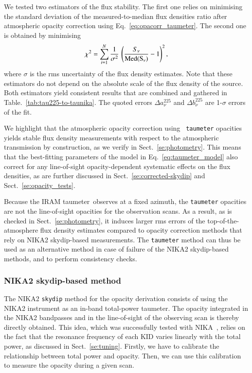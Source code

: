 \documentclass[traditionalabstract]{aa}
\newcommand{\taumeter}{taumeter}
\newcommand{\lp}[1]{#1}
\newcommand{\rev}[1]{#1}
\begin{document}
{We tested two estimators of the flux stability. The first one relies
on minimising the standard deviation of the measured-to-median flux
densities ratio after atmospheric opacity correction using
Eq.~\ref{eq:opacorr_taumeter}. The second one is obtained by minimising
\begin{equation}
\chi^2 = \sum_{i=1}^{N} \frac{1}{\sigma^2} \, \left( \frac{S_\nu}{\rm{Med}(S_\nu)} -1 \right)^2,  
\end{equation}
where $\sigma$ is the rms uncertainty of the flux density estimates. Note
that these estimators do not depend on
the absolute scale of the flux density of the source. Both estimators
yield consistent results that are combined and gathered in
Table.~\ref{tab:tau225-to-taunika}. The quoted errors
$\Delta a_\nu^{225}$ and $\Delta b_\nu^{225}$ are 1-$\sigma$ errors of
the fit.

{\rev We highlight that the atmospheric opacity correction using {\tt
taumeter} opacities yields stable flux density measurements with
respect to the atmospheric transmission by construction, as we
verify in Sect.~\ref{se:photometry}. This means that the best-fitting
parameters of the model in Eq.~\ref{eq:taumeter_model} also correct
for any line-of-sight opacity-dependent systematic effects on the flux
densities, as are further discussed in
Sect.~\ref{se:corrected-skydip} and Sect.~\ref{se:opacity_tests}.}

Because the IRAM \taumeter\ observes at a fixed azimuth, the
{\tt taumeter} opacities are not the line-of-sight opacities
for the observation scans. As a result, as is checked in
Sect.~\ref{se:photometry}, it induces larger rms errors of
the top-of-the-atmosphere flux density estimates compared to
opacity correction methods that rely on NIKA2 skydip-based
measurements. The {\tt taumeter} method can thus be used
as an alternative method in case of failure of the NIKA2 skydip-based
methods, and to perform consistency checks.


\subsubsection{NIKA2 skydip-based method}
\label{se:skydip-method}

The NIKA2 {\tt skydip} method for the opacity derivation consists of
using the NIKA2 instrument as an in-band total-power \taumeter. {\lp The opacity
integrated in the NIKA2 bandpasses and in the line-of-sight of the
observing scan is thereby directly obtained.} 
This idea,
which was successfully tested with NIKA~\citep{Catalano2014}, relies
on the fact that the resonance frequency of each KID varies linearly
with the total power, as discussed in Sect.~\ref{se:tuning}.
Firstly, we have to calibrate the relationship between total
power and opacity. Then, we can use this calibration to measure the
opacity during a given scan. 

}
\end{document}
